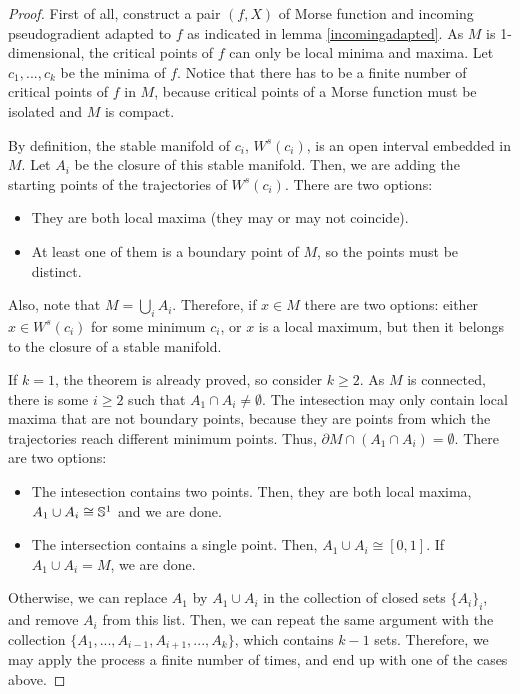 \begin{proof}
First of all, construct a pair $(f,X)$ of Morse function and incoming pseudogradient adapted to $f$ as indicated in lemma \ref{incomingadapted}. As $M$ is 1-dimensional, the critical points of $f$ can only be local minima and maxima. Let $c_1,...,c_k$ be the minima of $f$. Notice that there has to be a finite number of critical points of $f$ in $M$, because critical points of a Morse function must be isolated and $M$ is compact.

By definition, the stable manifold of $c_i$, $W^s(c_i)$, is an open interval embedded in $M$. Let $A_i$ be the closure of this stable manifold. Then, we are adding the starting points of the trajectories of $W^s(c_i)$. There are two options:

\begin{itemize}
	\item They are both local maxima (they may or may not coincide).
	\item At least one of them is a boundary point of $M$, so the points must be distinct.
\end{itemize}

Also, note that $M = \bigcup_i A_i$. Therefore, if $x \in M$ there are two options: either $x \in W^s(c_i)$ for some minimum $c_i$, or $x$ is a local maximum, but then it belongs to the closure of a stable manifold.

If $k=1$, the theorem is already proved, so consider $k \geq 2$. As $M$ is connected, there is some $i \geq 2$ such that $A_1 \cap A_i \neq \emptyset$. The intesection may only contain local maxima that are not boundary points, because they are points from which the trajectories reach different minimum points. Thus, $\partial M \cap (A_1 \cap A_i) = \emptyset$. There are two options:

\begin{itemize}
	\item The intesection contains two points. Then, they are both local maxima, $A_1 \cup A_i \cong \mathbb{S}^1$ and we are done.
	\item The intersection contains a single point. Then, $A_1 \cup A_i \cong [0,1]$. If $A_1 \cup A_i = M$, we are done.
\end{itemize}

Otherwise, we can replace $A_1$ by $A_1 \cup A_i$ in the collection of closed sets $\{A_i\}_i$, and remove $A_i$ from this list. Then, we can repeat the same argument with the collection $\{A_1,...,A_{i-1},A_{i+1},...,A_k\}$, which contains $k-1$ sets. Therefore, we may apply the process a finite number of times, and end up with one of the cases above.
\end{proof}

